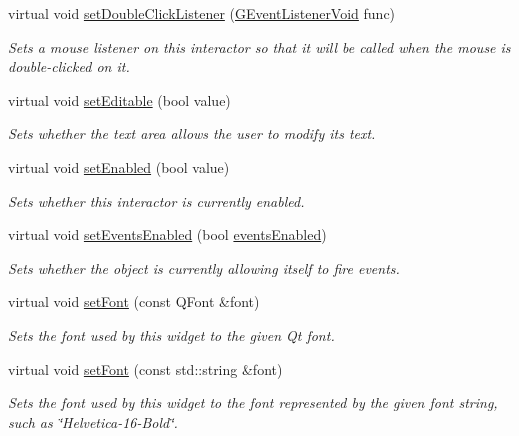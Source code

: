 \begin{DoxyCompactItemize}
virtual void \mbox{\hyperlink{classsgl_1_1GInteractor_a50096194d66f48c92dd4c512d41bfc76}{set\+Double\+Click\+Listener}} (\mbox{\hyperlink{namespacesgl_a54427ce97bb1c2804e4fe2b0a62e8b17}{G\+Event\+Listener\+Void}} func)
\begin{DoxyCompactList}\small\item\em Sets a mouse listener on this interactor so that it will be called when the mouse is double-\/clicked on it. \end{DoxyCompactList}\item 
virtual void \mbox{\hyperlink{classsgl_1_1GTextArea_a008d7fd44fb3e7a6886cdaddbc3644a2}{set\+Editable}} (bool value)
\begin{DoxyCompactList}\small\item\em Sets whether the text area allows the user to modify its text. \end{DoxyCompactList}\item 
virtual void \mbox{\hyperlink{classsgl_1_1GInteractor_ab831367dd84bbd579e02e55bacb21343}{set\+Enabled}} (bool value)
\begin{DoxyCompactList}\small\item\em Sets whether this interactor is currently enabled. \end{DoxyCompactList}\item 
virtual void \mbox{\hyperlink{classsgl_1_1GObservable_afaa30b2a9e0f378fd1c70d2f1d0b8216}{set\+Events\+Enabled}} (bool \mbox{\hyperlink{classsgl_1_1GInteractor_a597a370b592e3737d38d9d2f4e2031ea}{events\+Enabled}})
\begin{DoxyCompactList}\small\item\em Sets whether the object is currently allowing itself to fire events. \end{DoxyCompactList}\item 
virtual void \mbox{\hyperlink{classsgl_1_1GInteractor_a2592348886ffea646c6534bf88f7c49d}{set\+Font}} (const Q\+Font \&font)
\begin{DoxyCompactList}\small\item\em Sets the font used by this widget to the given Qt font. \end{DoxyCompactList}\item 
virtual void \mbox{\hyperlink{classsgl_1_1GInteractor_a8e096e8818d838aceae1d46d58fb3a7b}{set\+Font}} (const std\+::string \&font)
\begin{DoxyCompactList}\small\item\em Sets the font used by this widget to the font represented by the given font string, such as \char`\"{}\+Helvetica-\/16-\/\+Bold\char`\"{}. \end{DoxyCompactList}\item 

\end{DoxyCompactItemize}
